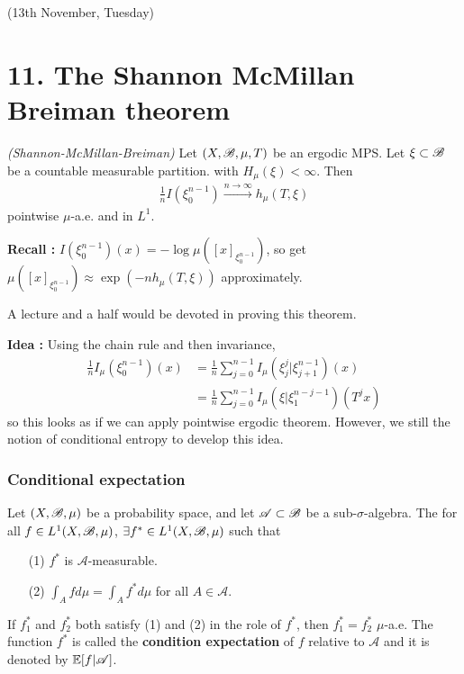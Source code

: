 \documentclass[12pt,a4paper]{report}
\newenvironment{proof}
{\begin{changemargin}{1cm}{0.5cm} 
	}%
	{\end{changemargin}
}
\begin{document}
\newday

(13th November, Tuesday)
\s

\section*{11. The Shannon McMillan Breiman theorem}

\thm \emph{(Shannon-McMillan-Breiman)} Let $(X, \mathscr{B}, \mu, T)$ be an ergodic MPS. Let $\xi \subset \mathscr{B}$ be a countable measurable partition. with $H_{\mu}(\xi) < \infty$. Then
\begin{align*}
\frac{1}{n} I(\xi^{n-1}_0) \xrightarrow{n\rightarrow \infty} h_{\mu}(T,\xi) 
\end{align*}
pointwise $\mu$-a.e. and in $L^1$.
\s

\textbf{Recall :} $I(\xi_0^{n-1})(x) = -\log \mu([x]_{\xi_0^{n-1}})$, so get $\mu([x]_{\xi_0^{n-1}})\approx \exp( -n h_{\mu}(T,\xi))$ approximately.
\s

A lecture and a half would be devoted in proving this theorem.

\begin{proof}
\textbf{Idea :} Using the chain rule and then invariance,
\begin{align*}
\frac{1}{n} I_{\mu}(\xi^{n-1}_0)(x) &= \frac{1}{n} \sum_{j=0}^{n-1} I_{\mu}(\xi_j^j |\xi_{j+1}^{n-1})(x) \\
&= \frac{1}{n} \sum_{j=0}^{n-1} I_{\mu}(\xi | \xi_1^{n-j-1})(T^j x)
\end{align*}
so this looks as if we can apply pointwise ergodic theorem. However, we still the notion of conditional entropy to develop this idea.
\end{proof}

\subsubsection*{Conditional expectation}

Let $(X,\mathscr{B}, \mu)$ be a probability space, and let $\mathscr{A} \subset \mathscr{B}$ be a sub-$\sigma$-algebra. The for all $f\in L^1(X,\mathscr{B}, \mu)$, $\exists f^* \in L^1(X, \mathscr{B}, \mu)$ such that
\begin{itemize}
\item[(1)] $f^*$ is $\mathscr{A}$-measurable.
\item[(2)] $\int_A fd\mu = \int_A f^* d\mu$ for all $A \in \mathscr{A}$.
\end{itemize}
If $f_1^*$ and $f_2^*$ both satisfy (1) and (2) in the role of $f^*$, then $f_1^* = f_2^*$ $\mu$-a.e. The function $f^*$ is called the \textbf{condition expectation} of $f$ relative to $\mathscr{A}$ and it is denoted by $\mathbb{E}  [f| \mathscr{A}]$.
\s
\end{document}

